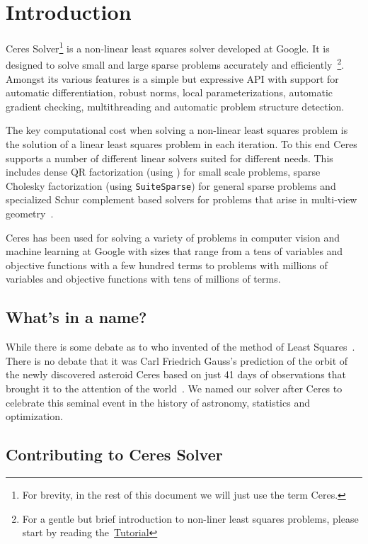 \chapter{Introduction}
\label{chapter:introduction}
Ceres Solver\footnote{For brevity, in the rest of this document we will just use the term Ceres.} is a non-linear least squares solver developed at Google. It is designed to solve small and large sparse problems accurately and efficiently~\footnote{For a gentle but brief introduction to non-liner least squares problems, please start by reading the~\hyperref[part:tutorial]{Tutorial}}. Amongst its various features is a simple but expressive API with support for automatic differentiation, robust norms, local parameterizations, automatic gradient checking, multithreading and automatic problem structure detection.

The key computational cost when solving a non-linear least squares problem is the solution of a linear least squares problem in each iteration. To this end Ceres supports a number of different linear solvers suited for different needs. This includes dense QR factorization (using \eigen) for small scale problems, sparse Cholesky factorization (using \texttt{SuiteSparse}) for general sparse problems and specialized Schur complement based solvers for problems that arise in multi-view geometry~\cite{hartley-zisserman-book-2004}.

Ceres has been used for solving a variety of problems in computer vision and machine learning at Google with sizes that range from a tens of variables and objective functions with a few hundred terms to problems with millions of variables and objective functions with tens of millions of terms. 


\section{What's in a name?}
While there is some debate as to who invented of the method of Least Squares~\cite{stigler1981gauss}. There is no debate that it was Carl Friedrich Gauss's prediction of the orbit of the newly discovered asteroid Ceres based on just 41 days of observations that brought it to the attention of the world~\cite{tennenbaum-director}. We named our solver after Ceres to celebrate this seminal event in the history of astronomy, statistics and optimization.

\section{Contributing to Ceres Solver}

